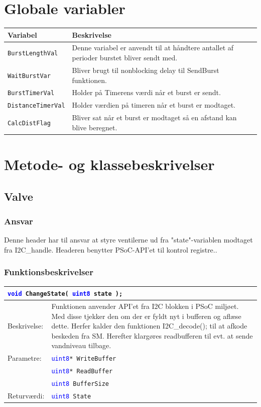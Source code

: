 \section{Globale variabler}
\begin{table}[H]
\begin{tabular}{|l|p{10cm}|}
\hline
\cellcolor[gray]{0.8}\textbf{Variabel} &\cellcolor[gray]{0.8} \textbf{Beskrivelse}\\ \hline
\texttt{BurstLengthVal} & Denne variabel er anvendt til at håndtere antallet af perioder burstet bliver sendt med.\\ \hline
\texttt{WaitBurstVar} & Bliver brugt til nonblocking delay til SendBurst funktionen.\\ \hline
\texttt{BurstTimerVal} & Holder på Timerens værdi når et burst er sendt.\\ \hline
\texttt{DistanceTimerVal} & Holder værdien på timeren når et burst er modtaget. \\ \hline
\texttt{CalcDistFlag} & Bliver sat når et burst er modtaget så en afstand kan blive beregnet.\\ \hline
\end{tabular}
\end{table}
\section{Metode- og klassebeskrivelser}
\subsection{Valve}
\subsubsection{Ansvar}
Denne header har til ansvar at styre ventilerne ud fra "state"-variablen modtaget fra I2C\_handle. Headeren benytter PSoC-API'et til kontrol registre..
\subsubsection{Funktionsbeskrivelser}
 
\begin{table}[H]
\begin{tabular}{l p{12.5cm}}
\multicolumn{2}{l}{\texttt{\textcolor{blue}{void} ChangeState( \textcolor{blue}{uint8} state );}} \\
\hline
Beskrivelse:& Funktionen anvender API'et fra I2C blokken i PSoC miljøet. Med disse tjekker den om der er fyldt nyt i bufferen og aflæse dette. Herfer kalder den funktionen I2C\_decode(); til at afkode beskeden fra SM. Herefter klargøres readbufferen til evt. at sende vandniveau tilbage. \\
Parametre:&\texttt{\textcolor{blue}{uint8}* WriteBuffer}\\
&\texttt{\textcolor{blue}{uint8}* ReadBuffer}\\
&\texttt{\textcolor{blue}{uint8} BufferSize} \\
Returværdi:&\texttt{\textcolor{blue}{uint8} State}\\
\end{tabular}
\end{table}

